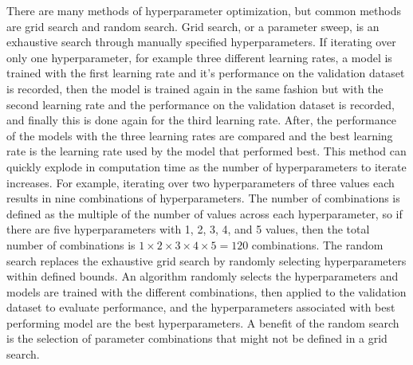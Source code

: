 There are many methods of hyperparameter optimization, but common methods are grid search and random search. Grid search, or a parameter sweep, is an exhaustive search through manually specified hyperparameters. If iterating over only one hyperparameter, for example three different learning rates, a model is trained with the first learning rate and it's performance on the validation dataset is recorded, then the model is trained again in the same fashion but with the second learning rate and the performance on the validation dataset is recorded, and finally this is done again for the third learning rate. After, the performance of the models with the three learning rates are compared and the best learning rate is the learning rate used by the model that performed best. This method can quickly explode in computation time as the number of hyperparameters to iterate increases. For example, iterating over two hyperparameters of three values each results in nine combinations of hyperparameters. The number of combinations is defined as the multiple of the number of values across each hyperparameter, so if there are five hyperparameters with 1, 2, 3, 4, and 5 values, then the total number of combinations is $1 \times 2 \times 3 \times 4 \times 5 = 120$ combinations. The random search replaces the exhaustive grid search by randomly selecting hyperparameters within defined bounds. An algorithm randomly selects the hyperparameters and models are trained with the different combinations, then applied to the validation dataset to evaluate performance, and the hyperparameters associated with best performing model are the best hyperparameters. A benefit of the random search is the selection of parameter combinations that might not be defined in a grid search.

